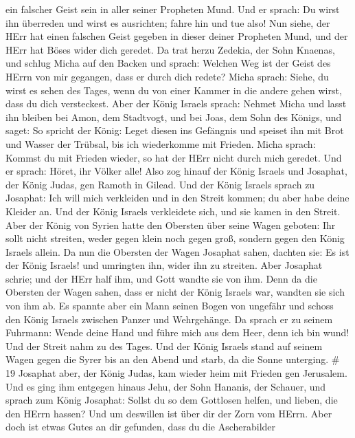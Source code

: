 ein falscher Geist sein in aller seiner Propheten Mund. Und er sprach:
Du wirst ihn überreden und wirst es ausrichten; fahre hin und tue also!
 Nun siehe, der HErr hat einen falschen Geist gegeben in
dieser deiner Propheten Mund, und der HErr hat Böses wider dich geredet.
 Da trat herzu Zedekia, der Sohn Knaenas, und schlug Micha
auf den Backen und sprach: Welchen Weg ist der Geist des HErrn von mir
gegangen, dass er durch dich redete?  Micha sprach: Siehe,
du wirst es sehen des Tages, wenn du von einer Kammer in die andere
gehen wirst, dass du dich versteckest.  Aber der König
Israels sprach: Nehmet Micha und lasst ihn bleiben bei Amon, dem
Stadtvogt, und bei Joas, dem Sohn des Königs,  und saget:
So spricht der König: Leget diesen ins Gefängnis und speiset ihn mit
Brot und Wasser der Trübsal, bis ich wiederkomme mit Frieden.
 Micha sprach: Kommst du mit Frieden wieder, so hat der
HErr nicht durch mich geredet. Und er sprach: Höret, ihr Völker alle!
 Also zog hinauf der König Israels und Josaphat, der König
Judas, gen Ramoth in Gilead.  Und der König Israels sprach
zu Josaphat: Ich will mich verkleiden und in den Streit kommen; du aber
habe deine Kleider an. Und der König Israels verkleidete sich, und sie
kamen in den Streit.  Aber der König von Syrien hatte den
Obersten über seine Wagen geboten: Ihr sollt nicht streiten, weder gegen
klein noch gegen groß, sondern gegen den König Israels allein.
 Da nun die Obersten der Wagen Josaphat sahen, dachten sie:
Es ist der König Israels! und umringten ihn, wider ihn zu streiten. Aber
Josaphat schrie; und der HErr half ihm, und Gott wandte sie von ihm.
 Denn da die Obersten der Wagen sahen, dass er nicht der
König Israels war, wandten sie sich von ihm ab.  Es spannte
aber ein Mann seinen Bogen von ungefähr und schoss den König Israels
zwischen Panzer und Wehrgehänge. Da sprach er zu seinem Fuhrmann: Wende
deine Hand und führe mich aus dem Heer, denn ich bin wund! 
Und der Streit nahm zu des Tages. Und der König Israels stand auf seinem
Wagen gegen die Syrer bis an den Abend und starb, da die Sonne
unterging. \# 19  Josaphat aber, der König Judas, kam wieder
heim mit Frieden gen Jerusalem.  Und es ging ihm entgegen
hinaus Jehu, der Sohn Hananis, der Schauer, und sprach zum König
Josaphat: Sollst du so dem Gottlosen helfen, und lieben, die den HErrn
hassen? Und um deswillen ist über dir der Zorn vom HErrn. 
Aber doch ist etwas Gutes an dir gefunden, dass du die Ascherabilder
